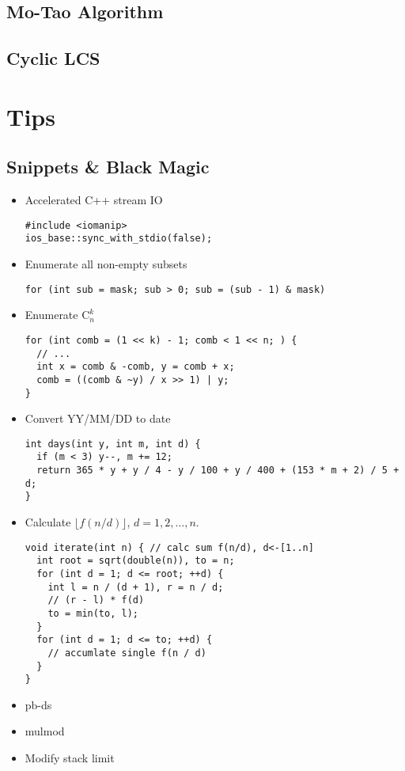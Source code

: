 \documentclass[10pt]{article}
\begin{document}
\subsection{Mo-Tao Algorithm}

\subsection{Cyclic LCS}


\section{Tips}
\subsection{Snippets \& Black Magic}
\begin{itemize}
  \item Accelerated C++ stream IO
    \begin{lstlisting}[frame=none]
#include <iomanip>
ios_base::sync_with_stdio(false);
    \end{lstlisting}
  \item Enumerate all non-empty subsets
    \begin{lstlisting}[frame=none]
for (int sub = mask; sub > 0; sub = (sub - 1) & mask)
    \end{lstlisting}
  \item Enumerate $\mathrm{C}_{n}^{k}$
    \begin{lstlisting}[frame=none]
for (int comb = (1 << k) - 1; comb < 1 << n; ) {
  // ...
  int x = comb & -comb, y = comb + x;
  comb = ((comb & ~y) / x >> 1) | y;
}
    \end{lstlisting}
  \item Convert YY/MM/DD to date
    \begin{lstlisting}[frame=none]
int days(int y, int m, int d) {
  if (m < 3) y--, m += 12;
  return 365 * y + y / 4 - y / 100 + y / 400 + (153 * m + 2) / 5 + d;
}
    \end{lstlisting}
  \item Calculate $\lfloor f(n/d) \rfloor$, $d=1, 2, \ldots, n$.
    \begin{lstlisting}[frame=none]
void iterate(int n) { // calc sum f(n/d), d<-[1..n]
  int root = sqrt(double(n)), to = n;
  for (int d = 1; d <= root; ++d) {
    int l = n / (d + 1), r = n / d;
    // (r - l) * f(d)
    to = min(to, l);
  }
  for (int d = 1; d <= to; ++d) {
    // accumlate single f(n / d)
  }
}
    \end{lstlisting}
  \item pb-ds
    
  \item mulmod
    
  \item Modify stack limit
    
\end{itemize}
\end{document}
